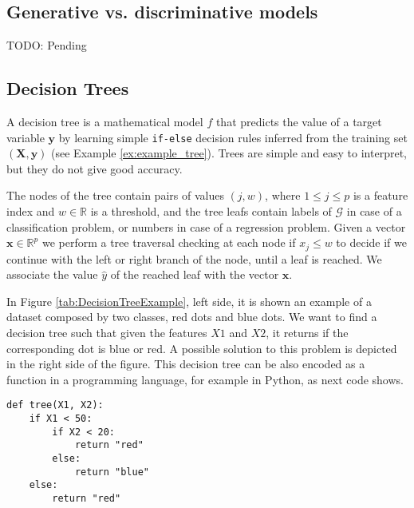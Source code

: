 \subsection{Generative vs. discriminative models}
\label{sec:generative_discriminative}

{\color{red} TODO: Pending}


\subsection{Decision Trees}
\label{subsec:learning_decision_trees}

A decision tree is a mathematical model $f$ that predicts the value of a target variable $\mathbf{y}$ by learning simple \texttt{if-else} decision rules inferred from the training set $(\mathbf{X}, \mathbf{y})$ (see Example \ref{ex:example_tree}). Trees are simple and easy to interpret, but they do not give good accuracy.


The nodes of the tree contain pairs of values $(j, w)$, where $1 \leq j \leq p$ is a feature index and $w \in \mathbb{R}$ is a threshold, and the tree leafs contain labels of $\mathcal{G}$ in case of a classification problem, or numbers in case of a regression problem. Given a vector $\textbf{x} \in \mathbb{R}^p$ we perform a tree traversal checking at each node if $x_j \leq w$ to decide if we continue with the left or right branch of the node, until a leaf is reached. We associate the value $\hat{y}$ of the reached leaf with the vector $\textbf{x}$.

\begin{example}
    \label{ex:example_tree}
    In Figure \ref{tab:DecisionTreeExample}, left side, it is shown an example of a dataset composed by two classes, red dots and blue dots. We want to find a decision tree such that given the features $X1$ and $X2$, it returns if the corresponding dot is blue or red. A possible solution to this problem is depicted in the right side of the figure. This decision tree can be also encoded as a function in a programming language, for example in Python, as next code shows.

    \begin{sourcecode}
        {\scriptsize \begin{verbatim}
def tree(X1, X2):
    if X1 < 50:
        if X2 < 20:
            return "red"
        else:
            return "blue"
    else:
        return "red"
\end{verbatim}}
    \end{sourcecode}

\end{example}

